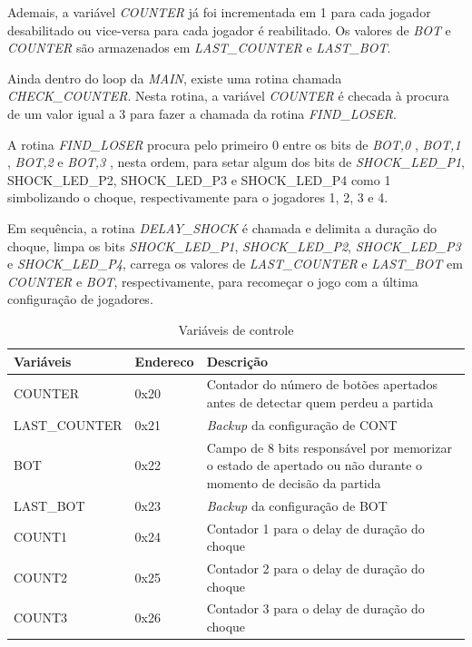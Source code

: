 \documentclass[article]{IEEEtran}
\begin{document}
Ademais, a variável \textit{COUNTER} já foi incrementada em 1 para cada jogador desabilitado ou vice-versa para cada jogador é reabilitado. Os valores de \textit{BOT} e \textit{COUNTER} são armazenados em \textit{LAST\_COUNTER} e \textit{LAST\_BOT}. 

Ainda dentro do loop da \textit{MAIN}, existe uma rotina chamada \textit{CHECK\_COUNTER}. Nesta rotina, a variável \textit{COUNTER} é checada à procura de um valor igual a 3 para fazer a chamada da rotina \textit{FIND\_LOSER}.

A rotina \textit{FIND\_LOSER} procura pelo primeiro 0 entre os bits de \textit{BOT,0} , \textit{BOT,1} , \textit{BOT,2} e \textit{BOT,3} , nesta ordem, para setar algum dos bits de \textit{SHOCK\_LED\_P1}, {SHOCK\_LED\_P2}, {SHOCK\_LED\_P3} e {SHOCK\_LED\_P4} como 1 simbolizando o choque, respectivamente para o jogadores 1, 2, 3 e 4.

Em sequência, a rotina \textit{DELAY\_SHOCK} é chamada e delimita a duração do choque, limpa os bits \textit{SHOCK\_LED\_P1}, \textit{SHOCK\_LED\_P2}, \textit{SHOCK\_LED\_P3} e \textit{SHOCK\_LED\_P4}, carrega os valores de \textit{LAST\_COUNTER} e \textit{LAST\_BOT} em \textit{COUNTER} e \textit{BOT}, respectivamente, para recomeçar o jogo com a última configuração de jogadores.

\begin{table}
  \centering
  \caption{Variáveis de controle}
  \vspace{0.5cm}
  \label{tab:variaveis}
  \begin{tabular}{|p{2cm}|p{1cm}|p{3.3cm}|} \hline
    Variáveis 		& Endereco & Descrição 						\\ \hline
    COUNTER		& 0x20	   & Contador do número de botões apertados antes
				     de detectar quem perdeu a partida			\\ \hline
    LAST\_COUNTER	& 0x21	   & \textit{Backup} da configuração de CONT		\\ \hline
    BOT			& 0x22	   & Campo de 8 bits responsável por memorizar
				    		 o estado de apertado ou não durante o 
				     		 momento de decisão da partida			\\ \hline
    LAST\_BOT	& 0x23	   & \textit{Backup} da configuração de BOT 		\\ \hline  
    COUNT1		& 0x24	   & Contador 1 para o delay de duração do choque	\\ \hline
    COUNT2		& 0x25	   & Contador 2 para o delay de duração do choque	\\ \hline
    COUNT3		& 0x26	   & Contador 3 para o delay de duração do choque	\\ \hline
  \end{tabular}
\end{table}
\end{document}
